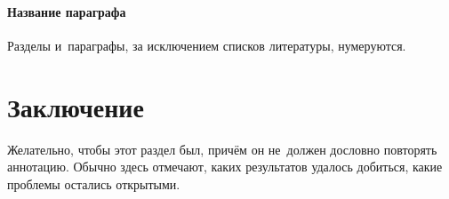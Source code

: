 \documentclass[12pt, twoside]{article}
\begin{document}
\paragraph{Название параграфа}
Разделы и~параграфы, за исключением списков литературы, нумеруются.

\section{Заключение}
Желательно, чтобы этот раздел был, причём он не~должен дословно повторять аннотацию.
Обычно здесь отмечают, каких результатов удалось добиться, какие проблемы остались открытыми.

\begin{thebibliography}{99}



	


 	
\end{thebibliography}
\end{document}
